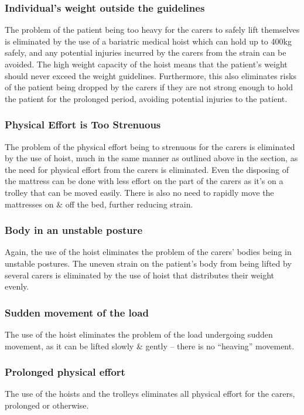 \documentclass[a4paper]{article}
\begin{document}
\begin{multicols}{2}
\subsubsection{Individual's weight outside the guidelines}
\label{sec:weight-outside-guidelines}
The problem of the patient being too heavy for the carers to safely lift themselves is eliminated by the use of a
bariatric medical hoist which can hold up to 400kg \supercite{optomed} safely, and any potential injuries incurred by
the carers from the strain can be avoided.
The high weight capacity of the hoist means that the patient's weight should never exceed the weight guidelines.
Furthermore, this also eliminates risks of the patient being dropped by the carers if they are not strong enough to hold
the patient for the prolonged period, avoiding potential injuries to the patient.

\subsubsection{Physical Effort is Too Strenuous}
The problem of the physical effort being to strenuous for the carers is eliminated by the use of hoist, much in the same
manner as outlined above in the \textbf{} section, as the need for physical
effort from the carers is eliminated. 
Even the disposing of the mattress can be done with less effort on the part of the carers as it's on a trolley that can
be moved easily.
There is also no need to rapidly move the mattresses on \& off the bed, further reducing strain.

\subsubsection{Body in an unstable posture}
Again, the use of the hoist eliminates the problem of the carers' bodies being in unstable postures.
The uneven strain on the patient's body from being lifted by several carers is eliminated by the use of hoist that
distributes their weight evenly.

\subsubsection{Sudden movement of the load}
The use of the hoist eliminates the problem of the load undergoing sudden movement, as it can be lifted slowly \&
gently -- there is no ``heaving'' movement.

\subsubsection{Prolonged physical effort}
The use of the hoists and the trolleys eliminates all physical effort for the carers, prolonged or otherwise.


\end{multicols}
\end{document}
